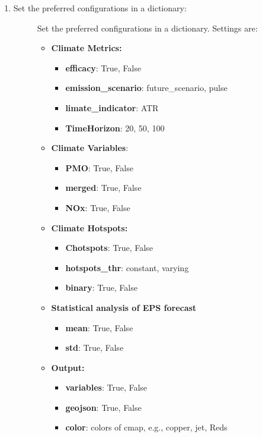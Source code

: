 \documentclass[a4paper,11pt,english]{sphinxmanual}
\begin{document}
\begin{enumerate}
%
\setcounter{enumi}{3}
\item {} \begin{description}
\item[{Set the preferred configurations in a dictionary:}] \leavevmode
Set the preferred configurations in a dictionary. Settings are:
\begin{itemize}
	\item  \textbf{Climate Metrics:}
	\begin{itemize}
	\item \textbf{efficacy}: True, False
	\item \textbf{emission\_scenario}: future\_scenario, pulse 
	\item \textbf{limate\_indicator}: ATR
	\item \textbf{TimeHorizon}: 20, 50, 100 
	\end{itemize}
	\item \textbf{Climate Variables}:
	\begin{itemize}
	\item \textbf{PMO}: True, False 
	\item \textbf{merged}: True, False 
	\item \textbf{NOx}: True, False 
	\end{itemize}
	\item \textbf{Climate Hotspots:}
	\begin{itemize}
	\item \textbf{Chotspots}: True, False 
	\item \textbf{hotspots\_thr}: constant, varying 
	\item \textbf{binary}: True, False 
	\end{itemize}	
	\item \textbf{Statistical analysis of EPS forecast}
	\begin{itemize}
	\item \textbf{mean}: True, False 
	\item \textbf{std}: True, False 	
	\end{itemize}
	\item \textbf{Output:}
	\begin{itemize}
	\item \textbf{variables}: True, False 
	\item \textbf{geojson}: True, False 
	\item \textbf{color}: colors of cmap, e.g., copper, jet, Reds 
    \end{itemize}
    \end{itemize}


\end{description}

\end{enumerate}
\end{document}
